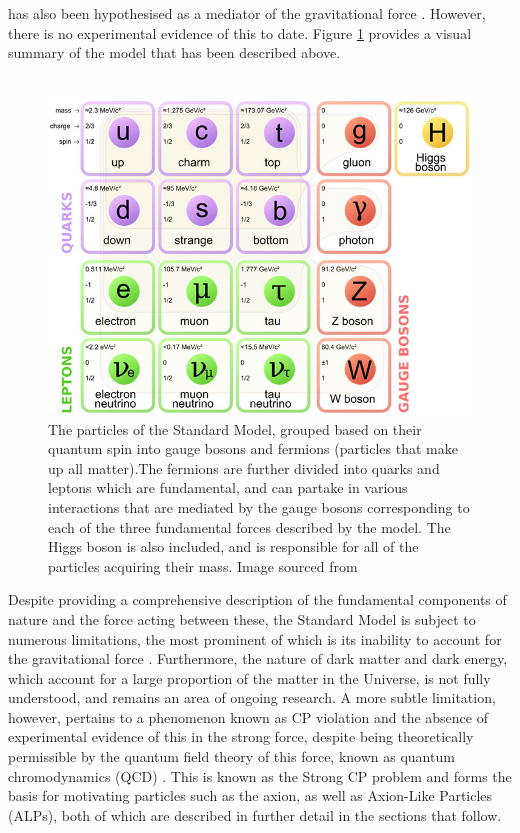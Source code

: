 has also been hypothesised as a mediator of the gravitational force \cite{Holstein:2006bh}. However, there is no experimental evidence of this to date. Figure \ref{StandardModel} provides a visual summary of the model that has been described above.\\
\\
\begin{figure}[H]
    \centering
    \includegraphics[scale = 0.4]{StandardModel.jpg}
    \caption{The particles of the Standard Model, grouped based on their quantum spin into gauge bosons and fermions (particles that make up all matter).The fermions are further divided into quarks and leptons which are fundamental, and can partake in various interactions that are mediated by the gauge bosons corresponding to each of the three fundamental forces described by the model. The Higgs boson is also included, and is responsible for all of the particles acquiring their mass. Image sourced from \cite{SM_Picture}}
    \label{StandardModel}
\end{figure}
Despite providing a comprehensive description of the fundamental components of nature and the force acting between these, the Standard Model is subject to numerous limitations, the most prominent of which is its inability to account for the gravitational force \cite{Holstein:2006bh}. Furthermore, the nature of dark matter and dark energy, which account for
a large proportion of the matter in the Universe, is not fully understood, and remains an area of ongoing research. A more subtle limitation, however, pertains to a phenomenon known as CP violation and the absence of experimental evidence of this in the strong force, despite being theoretically permissible by the quantum field theory of this force,
known as quantum chromodynamics (QCD) \cite{Garcia_Irastorza_2022}. This is known as the Strong CP problem and forms the basis for motivating particles such as the axion, as well as Axion-Like Particles (ALPs), both of which are described in further detail in the sections that follow.
